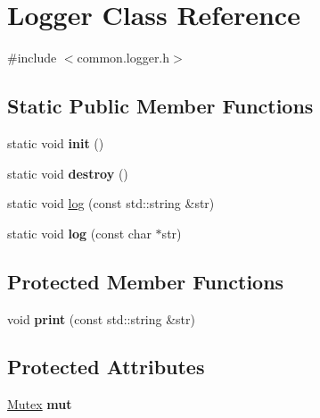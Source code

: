 \hypertarget{classLogger}{\section{Logger Class Reference}
\label{classLogger}
}


{\ttfamily \#include $<$common.\-logger.\-h$>$}

\subsection*{Static Public Member Functions}
\begin{DoxyCompactItemize}
\item 
\hypertarget{classLogger_ad9f38f9cc2d75a6207f4972427aa74f1}{static void {\bfseries init} ()}\label{classLogger_ad9f38f9cc2d75a6207f4972427aa74f1}

\item 
\hypertarget{classLogger_a45bbe5b05294541b9ee7e2758c6c30b7}{static void {\bfseries destroy} ()}\label{classLogger_a45bbe5b05294541b9ee7e2758c6c30b7}

\item 
static void \hyperlink{classLogger_aba76d45e4a7eb8704fe408c7e8a0d035}{log} (const std\-::string \&str)
\item 
\hypertarget{classLogger_a5db1668abe71e787c3ad2ad35de6a2e5}{static void {\bfseries log} (const char $\ast$str)}\label{classLogger_a5db1668abe71e787c3ad2ad35de6a2e5}

\end{DoxyCompactItemize}
\subsection*{Protected Member Functions}
\begin{DoxyCompactItemize}
\item 
\hypertarget{classLogger_aae0dca7faca4a0288fa8c379197844e1}{void {\bfseries print} (const std\-::string \&str)}\label{classLogger_aae0dca7faca4a0288fa8c379197844e1}

\end{DoxyCompactItemize}
\subsection*{Protected Attributes}
\begin{DoxyCompactItemize}
\item 
\hypertarget{classLogger_a1cd59b63f5c68f080afe1165730dfbc6}{\hyperlink{classMutex}{Mutex} {\bfseries mut}}\label{classLogger_a1cd59b63f5c68f080afe1165730dfbc6}

\end{DoxyCompactItemize}
